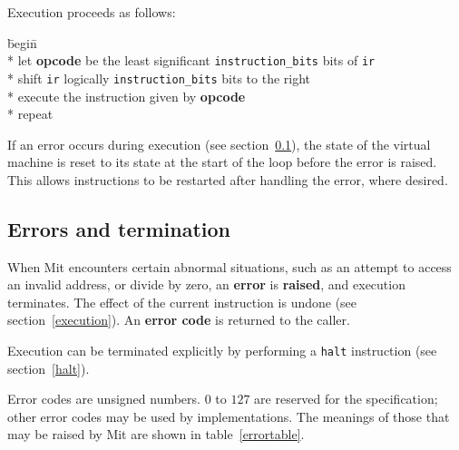 \documentclass[a4paper]{article}
\begin{document}
Execution proceeds as follows:

\begin{tabbing}
\hspace{0.5in}\=begin\=\+\+ \\*
let \textbf{opcode} be the least significant {\tt instruction\_bits} bits of {\tt ir} \\*
shift {\tt ir} logically {\tt instruction\_bits} bits to the right \\*
execute the instruction given by \textbf{opcode} \- \\*
repeat
\end{tabbing}

If an error occurs during execution (see section~\ref{errors}), the state of the virtual machine is reset to its state at the start of the loop before the error is raised. This allows instructions to be restarted after handling the error, where desired.

\subsection{Errors and termination}
\label{errors}

When Mit encounters certain abnormal situations, such as an attempt to access an invalid address, or divide by zero, an {\bf error} is {\bf raised}, and execution terminates. The effect of the current instruction is undone (see section~\ref{execution}). An {\bf error code} is returned to the caller.

Execution can be terminated explicitly by performing a {\tt halt} instruction (see section~\ref{halt}).

Error codes are unsigned numbers. $0$ to $127$ are reserved for the specification; other error codes may be used by implementations. The meanings of those that may be raised by Mit are shown in table~\ref{errortable}.
\end{document}
